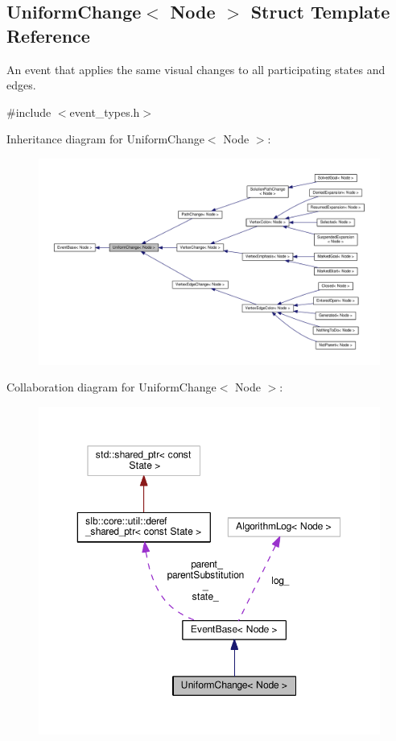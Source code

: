 \hypertarget{structUniformChange}{}\subsection{Uniform\+Change$<$ Node $>$ Struct Template Reference}
\label{structUniformChange}


An event that applies the same visual changes to all participating states and edges.  




{\ttfamily \#include $<$event\+\_\+types.\+h$>$}



Inheritance diagram for Uniform\+Change$<$ Node $>$\+:\nopagebreak
\begin{figure}[H]
\begin{center}
\leavevmode
\includegraphics[width=350pt]{structUniformChange__inherit__graph}
\end{center}
\end{figure}


Collaboration diagram for Uniform\+Change$<$ Node $>$\+:\nopagebreak
\begin{figure}[H]
\begin{center}
\leavevmode
\includegraphics[width=350pt]{structUniformChange__coll__graph}
\end{center}
\end{figure}
